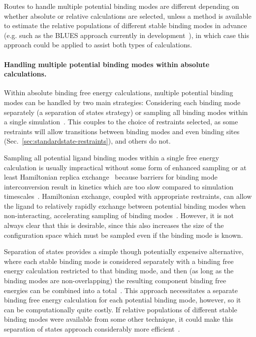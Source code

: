 \documentclass[9pt,bestpractices,pubversion]{livecoms}
\begin{document}
Routes to handle multiple potential binding modes are different depending on whether absolute or relative calculations are selected, unless a method is available to estimate the relative populations of different stable binding modes in advance (e.g. such as the BLUES approach currently in development~\cite{gill2018binding}), in which case this approach could be applied to assist both types of calculations.

\paragraph{Handling multiple potential binding modes within absolute calculations.}
Within absolute binding free energy calculations, multiple potential binding modes can be handled by two main strategies: Considering each binding mode separately (a separation of states strategy) or sampling all binding modes within a single simulation~\cite{mobley2012perspective}.
This couples to the choice of restraints selected, as some restraints will allow transitions between binding modes and even binding sites (Sec.~\ref{sec:standardstate-restraints}), and others do not.

Sampling all potential ligand binding modes within a single free energy calculation is usually impractical without some form of enhanced sampling or at least Hamiltonian replica exchange~\cite{wang2013identifying} because barriers for binding mode interconversion result in kinetics which are too slow compared to simulation timescales~\cite{mobley2006use, palma2012computation,mobley2012perspective, gill2018binding}.
Hamiltonian exchange, coupled with appropriate restraints, can allow the ligand to relatively rapidly exchange between potential binding modes when non-interacting, accelerating sampling of binding modes~\cite{wang2013identifying}. However, it is not always clear that this is desirable, since this also increases the size of the configuration space which must be sampled even if the binding mode is known.

Separation of states provides a simple though potentially expensive alternative, where each stable binding mode is considered separately with a binding free energy calculation restricted to that binding mode, and then (as long as the binding modes are non-overlapping) the resulting component binding free energies can be combined into a total~\cite{mobley2006use, mobley2012perspective}.
This approach necessitates a separate binding free energy calculation for each potential binding mode, however, so it can be computationally quite costly.
If relative populations of different stable binding modes were available from some other technique, it could make this separation of states approach considerably more efficient~\cite{mobley2012perspective, gill2018binding}.
\end{document}
